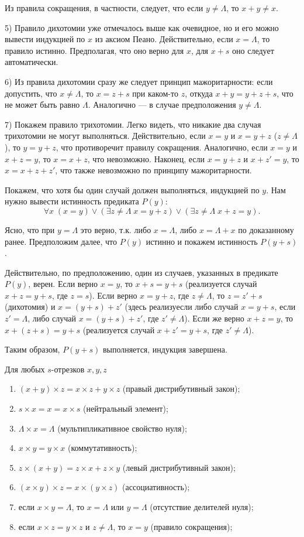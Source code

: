 Из правила сокращения, в частности, следует, что если $y\ne\Lambda$, то $x+y\ne x$.

5) Правило дихотомии уже отмечалось выше как очевидное, но и его можно вывести индукцией по $x$ из аксиом Пеано. Действительно, если $x=\Lambda$, то правило истинно. Предполагая, что оно верно для $x$, для $x+s$ оно следует автоматически.

6) Из правила дихотомии сразу же следует принцип мажоритарности: если допустить, что $x\ne\Lambda$, то $x=z+s$ при каком-то $z$, откуда $x+y=y+z+s$, что не может быть равно $\Lambda$. Аналогично --- в случае предположения $y\ne\Lambda$.

7) Покажем правило трихотомии. Легко видеть, что никакие два случая трихотомии не могут выполняться. Действительно, если $x=y$ и $x=y+z$ ($z\ne\Lambda$), то $y=y+z$, что противоречит правилу сокращения. Аналогично, если $x=y$ и $x+z=y$, то $x=x+z$, что невозможно. Наконец, если $x=y+z$ и $x+z'=y$, то $x=x+z+z'$, что также невозможно по принципу мажоритарности.

Покажем, что хотя бы один случай должен выполняться, индукцией по $y$. Нам нужно вывести истинность предиката $P(y)$:
$$
\forall x\;(x=y)\lor(\exists z\ne\Lambda\;x=y+z)\lor(\exists z\ne\Lambda\;x+z=y).
$$

Ясно, что при $y=\Lambda$ это верно, т.к. либо $x=\Lambda$, либо $x=\Lambda+x$ по доказанному ранее. Предположим далее, что $P(y)$ истинно и покажем истинность $P(y+s)$.

Действительно, по предположению, один из случаев, указанных в предикате $P(y)$, верен. Если верно $x=y$, то $x+s=y+s$ (реализуется случай $x+z=y+s$, где $z=s$). Если верно $x=y+z$, где $z\ne\Lambda$, то $z=z'+s$ (дихотомия) и $x=(y+s)+z'$ (здесь реализуесли либо случай $x=y+s$, если $z'=\Lambda$, либо случай $x=(y+s)+z'$, где $z'\ne\Lambda$).
Если же верно $x+z=y$, то $x+(z+s)=y+s$ (реализуется случай $x+z'=y+s$, где $z'\ne\Lambda$).

Таким образом, $P(y+s)$ выполняется, индукция завершена.
\epf

\begin{thrm}\label{Production} Для любых $s$-отрезков $x,y,z$
\begin{enumerate}[P1]
\item $(x+y)\times z=x\times z+y\times z$ (правый дистрибутивный закон);
\item $s\times x=x=x\times s$ (нейтральный элемент);
\item $\Lambda\times x=\Lambda$ (мультипликативное свойство нуля);
\item $x\times y=y\times x$ (коммутативность);
\item $z\times (x+y)=z\times x+z\times y$ (левый дистрибутивный закон);
\item $(x\times y)\times z=x\times(y\times z)$ (ассоциативность);
\item если $x\times y=\Lambda$, то $x=\Lambda$ или $y=\Lambda$ (отсутствие делителей нуля);
\item если $x\times z=y\times z$ и $z\ne\Lambda$, то $x=y$ (правило сокращения);
\end{enumerate}
\end{thrm}


